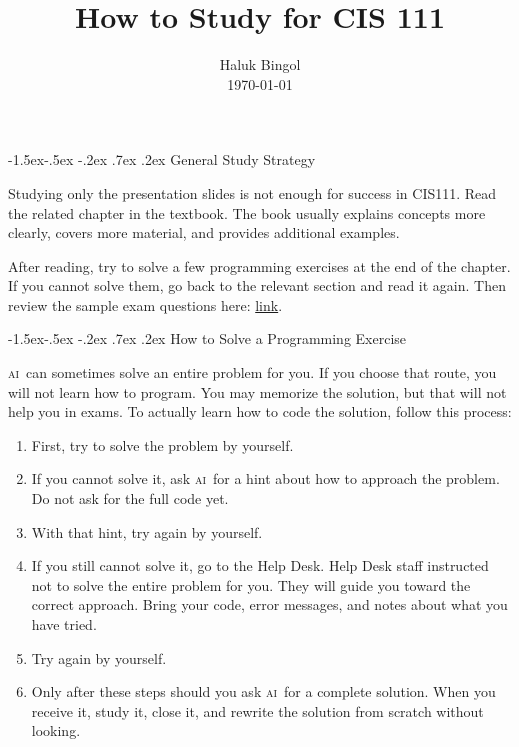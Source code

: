 \documentclass[12pt,twocolumn]{amsart}
\title{How to Study for CIS 111}
\author{
	Haluk Bingol\\
	\today
}
\makeatletter
\newcommand{\AI}{\textsc{ai}}
\renewcommand\section{\@startsection{section}{1}%
  \z@
  {-1.5ex\@plus -.5ex \@minus -.2ex}%
  {.7ex \@plus .2ex}%
  {\normalfont\large\bfseries}}
\makeatother
\begin{document}
\maketitle
\tableofcontents




\section{General Study Strategy}

Studying only the presentation slides is not enough for success in CIS111. 
Read the related chapter in the textbook. 
The book usually explains concepts more clearly, covers more material, and 
provides additional examples.

After reading, try to solve a few programming exercises at the end of the chapter. 
If you cannot solve them, go back to the relevant section and read it again. 
Then review the sample exam questions here:
\href{https://drive.google.com/drive/folders/1r1TcJdlwSAhWCe9vA9BqdJSkVTFXkmkM?usp=drive_link}
	{link}.




\section{How to Solve a Programming Exercise}

\AI\ can sometimes solve an entire problem for you. 
If you choose that route, you will not learn how to program. 
You may memorize the solution, but that will not help you in exams.
To actually learn how to code the solution, follow this process:

\begin{enumerate}
	
	\item 
	First, try to solve the problem by yourself.
	
	\item 
	If you cannot solve it, ask \AI\ for a hint about how to approach the problem. 
	Do not ask for the full code yet.
	
	\item 
	With that hint, try again by yourself.
	
	\item 
	If you still cannot solve it, go to the Help Desk. 
	Help Desk staff instructed not to solve the entire problem for you. 
	They will guide you toward the correct approach. 
	Bring your code, error messages, and notes about what you have tried.
	
	\item 
	Try again by yourself.
	
	\item 
	Only after these steps should you ask \AI\ for a complete solution. 
	When you receive it, study it, close it, and rewrite the solution from scratch without looking.
	
\end{enumerate}
\end{document}
